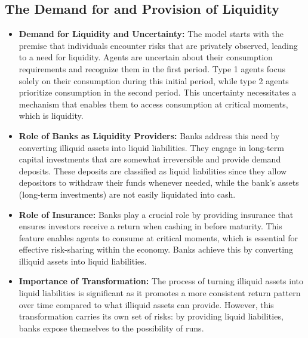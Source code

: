 \subsection{The Demand for and Provision of Liquidity}
\begin{itemize}
    \item \textbf{Demand for Liquidity and Uncertainty:} The model starts with the premise that individuals encounter risks that are privately observed, leading to a need for liquidity. Agents are uncertain about their consumption requirements and recognize them in the first period. Type 1 agents focus solely on their consumption during this initial period, while type 2 agents prioritize consumption in the second period. This uncertainty necessitates a mechanism that enables them to access consumption at critical moments, which is liquidity.
    \item \textbf{Role of Banks as Liquidity Providers:} Banks address this need by converting illiquid assets into liquid liabilities. They engage in long-term capital investments that are somewhat irreversible and provide demand deposits. These deposits are classified as liquid liabilities since they allow depositors to withdraw their funds whenever needed, while the bank’s assets (long-term investments) are not easily liquidated into cash.
    \item \textbf{Role of Insurance:} Banks play a crucial role by providing insurance that ensures investors receive a return when cashing in before maturity. This feature enables agents to consume at critical moments, which is essential for effective risk-sharing within the economy. Banks achieve this by converting illiquid assets into liquid liabilities.
    \item \textbf{Importance of Transformation:} The process of turning illiquid assets into liquid liabilities is significant as it promotes a more consistent return pattern over time compared to what illiquid assets can provide. However, this transformation carries its own set of risks: by providing liquid liabilities, banks expose themselves to the possibility of runs.
\end{itemize}

